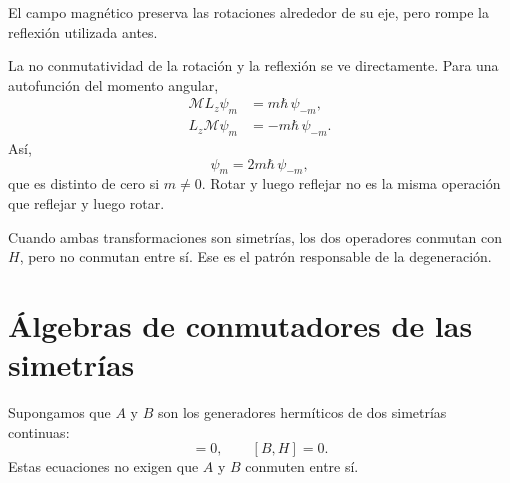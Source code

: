 El campo magnético preserva las rotaciones alrededor de su eje, pero rompe la reflexión utilizada antes.

\begin{classroomqa}
\end{classroomqa}

La no conmutatividad de la rotación y la reflexión se ve directamente. Para una autofunción del momento angular,
\begin{align}
\mathcal M L_z\psi_m
&=m\hbar\,\psi_{-m},\\
L_z\mathcal M\psi_m
&=-m\hbar\,\psi_{-m}.
\end{align}
Así,
\begin{equation}
[\mathcal M,L_z]\psi_m
=2m\hbar\,\psi_{-m},
\end{equation}
que es distinto de cero si \(m\neq0\). Rotar y luego reflejar no es la misma operación que reflejar y luego rotar.

Cuando ambas transformaciones son simetrías, los dos operadores conmutan con \(H\), pero no conmutan entre sí. Ese es el patrón responsable de la degeneración.

\begin{classroomqa}
\end{classroomqa}

\section{Álgebras de conmutadores de las simetrías}

Supongamos que \(A\) y \(B\) son los generadores hermíticos de dos simetrías continuas:
\begin{equation}
[A,H]=0,
\qquad
[B,H]=0.
\end{equation}
Estas ecuaciones no exigen que \(A\) y \(B\) conmuten entre sí.

